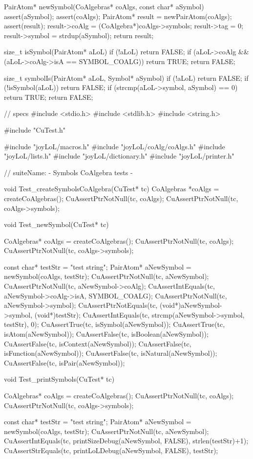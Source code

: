 PairAtom* newSymbol(CoAlgebras* coAlgs, const char* aSymbol) {
  assert(aSymbol);
  assert(coAlgs);
  PairAtom* result = newPairAtom(coAlgs);
  assert(result);
  result->coAlg  = (CoAlgebra*)coAlgs->symbols;
  result->tag    = 0;
  result->symbol = strdup(aSymbol);
  return result;
}

size_t isSymbol(PairAtom* aLoL) {
  if (!aLoL) return FALSE;
  if (aLoL->coAlg && (aLoL->coAlg->isA == SYMBOL_COALG)) return TRUE;
  return FALSE;
}

size_t symbolIs(PairAtom* aLoL, Symbol* aSymbol) {
  if (!aLoL) return FALSE;
  if (!isSymbol(aLoL)) return FALSE;
  if (strcmp(aLoL->symbol, aSymbol) == 0) return TRUE;
  return FALSE;
}


\stoptyping

\starttyping
// specs
#include <stdio.h>
#include <stdlib.h>
#include <string.h>

#include "CuTest.h"

#include "joyLoL/macros.h"
#include "joyLoL/coAlg/coAlgs.h"
#include "joyLoL/lists.h"
#include "joyLoL/dictionary.h"
#include "joyLoL/printer.h"

// suiteName: - Symbols CoAlgebra tests -

void Test_createSymbolsCoAlgebra(CuTest* tc) {
  CoAlgebras *coAlgs = createCoAlgebras();
  CuAssertPtrNotNull(tc, coAlgs);
  CuAssertPtrNotNull(tc, coAlgs->symbols);
}

void Test_newSymbol(CuTest* tc) {
  CoAlgebras* coAlgs = createCoAlgebras();
  CuAssertPtrNotNull(tc, coAlgs);
  CuAssertPtrNotNull(tc, coAlgs->symbols);

  const char* testStr = "test string";
  PairAtom* aNewSymbol = newSymbol(coAlgs, testStr);
  CuAssertPtrNotNull(tc, aNewSymbol);
  CuAssertPtrNotNull(tc, aNewSymbol->coAlg);
  CuAssertIntEquals(tc, aNewSymbol->coAlg->isA, SYMBOL_COALG);
  CuAssertPtrNotNull(tc, aNewSymbol->symbol);
  CuAssertPtrNotEquals(tc, (void*)aNewSymbol->symbol, (void*)testStr);
  CuAssertIntEquals(tc, strcmp(aNewSymbol->symbol, testStr), 0);
  CuAssertTrue(tc, isSymbol(aNewSymbol));
  CuAssertTrue(tc, isAtom(aNewSymbol));
  CuAssertFalse(tc, isBoolean(aNewSymbol));
  CuAssertFalse(tc, isContext(aNewSymbol));
  CuAssertFalse(tc, isFunction(aNewSymbol));
  CuAssertFalse(tc, isNatural(aNewSymbol));
  CuAssertFalse(tc, isPair(aNewSymbol));
}

void Test_printSymbols(CuTest* tc) {
  CoAlgebras* coAlgs = createCoAlgebras();
  CuAssertPtrNotNull(tc, coAlgs);
  CuAssertPtrNotNull(tc, coAlgs->symbols);

  const char* testStr = "test string";
  PairAtom* aNewSymbol = newSymbol(coAlgs, testStr);
  CuAssertPtrNotNull(tc, aNewSymbol);
  CuAssertIntEquals(tc, printSizeDebug(aNewSymbol, FALSE), strlen(testStr)+1);
  CuAssertStrEquals(tc, printLoLDebug(aNewSymbol, FALSE), testStr);
}

